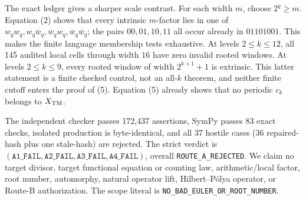 \documentclass[10pt]{article}
\begin{document}
The exact ledger gives a sharper scale contrast.  For each width $m$, choose
$2^q\geq m$.  Equation (2) shows that every intrinsic $m$-factor lies in one
of $w_qw_q,w_q\overline w_q,\overline w_qw_q,
\overline w_q\overline w_q$; the pairs $00,01,10,11$ all occur already in
$01101001$.  This makes
the finite language membership tests exhaustive.  At levels $2\leq k\leq12$,
all 145 audited local cells through width $16$ have zero invalid rooted
windows.  At levels $2\leq k\leq9$, every rooted window of width
$2^{k+1}+1$ is extrinsic.  This latter statement is a finite checked control,
not an all-$k$ theorem, and neither finite cutoff enters the proof of (5).
Equation (5) already shows that no periodic $c_k$
belongs to $X_{\rm TM}$.

The independent checker passes 172,437 assertions, SymPy passes 83 exact
checks, isolated production is byte-identical, and all 37 hostile cases
(36 repaired-hash plus one stale-hash) are rejected.  The strict verdict is
$(\texttt{A1\_FAIL},\texttt{A2\_FAIL},\texttt{A3\_FAIL},
\texttt{A4\_FAIL})$, overall \texttt{ROUTE\_A\_REJECTED}.  We claim no
target divisor, target functional equation or counting law, arithmetic/local
factor, root number, automorphy, natural operator lift, Hilbert--P\'olya
operator, or Route-B authorization.  The scope literal is
\texttt{NO\_BAD\_EULER\_OR\_ROOT\_NUMBER}.
\end{document}
